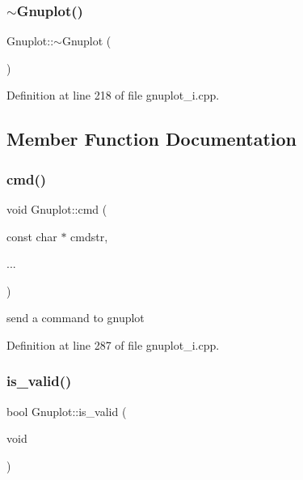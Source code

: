 \subsubsection{\texorpdfstring{$\sim$\+Gnuplot()}{~Gnuplot()}}
{\footnotesize\ttfamily Gnuplot\+::$\sim$\+Gnuplot (\begin{DoxyParamCaption}{ }\end{DoxyParamCaption})}



Definition at line 218 of file gnuplot\+\_\+i.\+cpp.



\subsection{Member Function Documentation}
\mbox{\label{class_gnuplot_a6f299285af0a0ee2cf1722c469aa1a57}} 
\subsubsection{\texorpdfstring{cmd()}{cmd()}}
{\footnotesize\ttfamily void Gnuplot\+::cmd (\begin{DoxyParamCaption}\item[{const char $\ast$}]{cmdstr,  }\item[{}]{... }\end{DoxyParamCaption})}



send a command to gnuplot 



Definition at line 287 of file gnuplot\+\_\+i.\+cpp.

\mbox{\label{class_gnuplot_a0daaf54cd8e41dbbd574722f3a831cfd}} 
\subsubsection{\texorpdfstring{is\+\_\+valid()}{is\_valid()}}
{\footnotesize\ttfamily bool Gnuplot\+::is\+\_\+valid (\begin{DoxyParamCaption}\item[{void}]{ }\end{DoxyParamCaption})}



